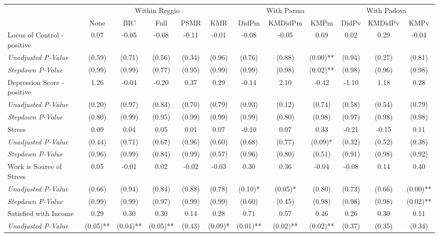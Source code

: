 \begin{tabular}{l c c c c c c c c c c c}
\toprule
& \multicolumn{5}{c}{Within Reggio} & \multicolumn{3}{c}{With Parma} & \multicolumn{3}{c}{With Padova} \\\cmidrule(lr){2-6} \cmidrule(lr){7-9} \cmidrule(lr){10-12}
 & None & BIC & Full & PSMR & KMR & DidPm & KMDidPm & KMPm & DidPv & KMDidPv & KMPv \\
\midrule
Locus of Control - positive & 0.07 & -0.05 & -0.08 & -0.11 & -0.01 & -0.08 & -0.05 & 0.69 & 0.02 & 0.29 & -0.04 \\
\quad \textit{Unadjusted P-Value} & (0.59) & (0.71) & (0.56) & (0.34) & (0.96) & (0.76) & (0.88) & (0.00)** & (0.94) & (0.27) & (0.81) \\
\quad \textit{Stepdown P-Value} & (0.99) & (0.99) & (0.77) & (0.95) & (0.99) & (0.99) & (0.98) & (0.02)** & (0.98) & (0.96) & (0.98) \\
Depression Score - positive & 1.26 & -0.04 & -0.20 & 0.37 & 0.29 & -0.14 & 2.10 & -0.42 & -1.10 & 1.18 & 0.28 \\
\quad \textit{Unadjusted P-Value} & (0.20) & (0.97) & (0.83) & (0.70) & (0.79) & (0.93) & (0.12) & (0.74) & (0.58) & (0.54) & (0.79) \\
\quad \textit{Stepdown P-Value} & (0.80) & (0.99) & (0.95) & (0.99) & (0.99) & (0.99) & (0.80) & (0.98) & (0.97) & (0.98) & (0.98) \\
Stress & 0.09 & 0.04 & 0.05 & 0.01 & 0.07 & -0.10 & 0.07 & 0.33 & -0.21 & -0.15 & 0.11 \\
\quad \textit{Unadjusted P-Value} & (0.44) & (0.71) & (0.67) & (0.96) & (0.60) & (0.68) & (0.77) & (0.09)* & (0.32) & (0.52) & (0.38) \\
\quad \textit{Stepdown P-Value} & (0.96) & (0.99) & (0.84) & (0.99) & (0.57) & (0.96) & (0.80) & (0.51) & (0.91) & (0.98) & (0.92) \\
Work is Source of Stress & 0.05 & -0.01 & 0.02 & -0.02 & -0.03 & 0.30 & 0.36 & -0.04 & -0.08 & 0.14 & 0.40 \\
\quad \textit{Unadjusted P-Value} & (0.66) & (0.94) & (0.84) & (0.88) & (0.78) & (0.10)* & (0.05)* & (0.80) & (0.73) & (0.66) & (0.00)** \\
\quad \textit{Stepdown P-Value} & (0.99) & (0.99) & (0.97) & (0.99) & (0.99) & (0.60) & (0.45) & (0.98) & (0.98) & (0.98) & (0.02)** \\
Satisfied with Income & 0.29 & 0.30 & 0.30 & 0.14 & 0.28 & 0.71 & 0.57 & 0.46 & 0.26 & 0.30 & 0.11 \\
\quad \textit{Unadjusted P-Value} & (0.05)** & (0.04)** & (0.05)** & (0.43) & (0.09)* & (0.01)** & (0.02)** & (0.02)** & (0.37) & (0.35) & (0.34) \\

\end{tabular}
